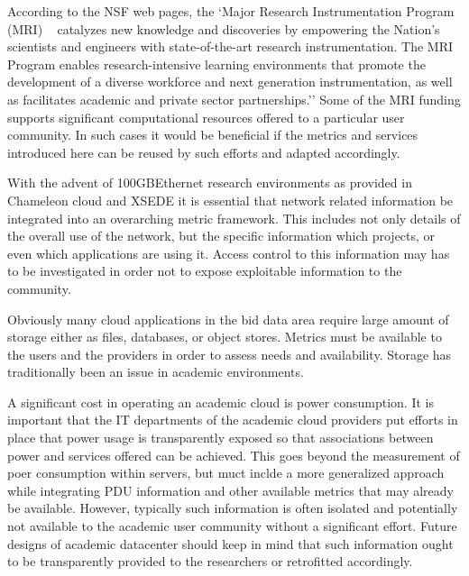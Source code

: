 \documentclass{sig-alternate-05-2015}
\begin{document}
\begin{description}
\setlength\itemsep{-2pt}

\item[\it MRIs.] According to the NSF web pages, the `Major Research Instrumentation Program (MRI) ~\cite{nsf-mri} catalyzes new knowledge and discoveries by empowering the Nation's scientists and engineers with state-of-the-art research instrumentation. The MRI Program enables research-intensive learning environments that promote the development of a diverse workforce and next generation instrumentation, as well as facilitates academic and private sector partnerships.'' Some of the MRI funding supports significant computational resources offered to a particular user community. In such cases it would be beneficial if the metrics and services introduced here can be reused by such efforts and adapted accordingly.

\item[\it Networks.] With the advent of 100GBEthernet research environments as provided in Chameleon cloud and XSEDE it is essential that network related information be integrated into an overarching metric framework. This includes not only details of the overall use of the network, but the specific information which projects, or even which applications are using it. Access control to this information may has to be investigated in order not to expose exploitable information to the community.

\item[\it Storage.] Obviously many cloud applications in the bid data area require large amount of storage either as files, databases, or object stores. Metrics must be available to the users and the providers in order to assess needs and availability. Storage has traditionally been an issue in academic environments.

\item[\it Power.] A significant cost in operating an academic cloud is power consumption. It is important that the IT departments of the academic cloud providers put efforts in place that power usage is transparently exposed so that associations between power and services offered can be achieved. This goes beyond the measurement of poer consumption within servers, but muct inclde a more generalized approach while integrating PDU information and other available metrics that may already be available. However, typically such information is often isolated and potentially not available to the academic user community without a significant effort. Future designs of academic datacenter should keep in mind that such information ought to be transparently provided to the researchers or retrofitted accordingly.


\end{description}
\end{document}
